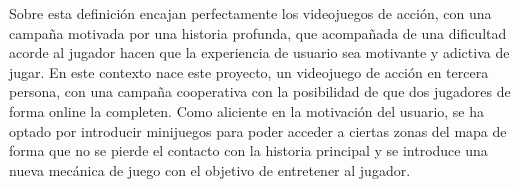 Sobre esta definición encajan perfectamente los videojuegos de acción, con una campaña motivada por una historia profunda, que acompañada de una dificultad acorde al jugador hacen que la experiencia de usuario sea motivante y adictiva de jugar. En este contexto nace este proyecto, un videojuego de acción en tercera persona, con una campaña cooperativa con la posibilidad de que dos jugadores de forma online la completen. Como aliciente en la motivación del usuario, se ha optado por introducir minijuegos para poder acceder a ciertas zonas del mapa de forma que no se pierde el contacto con la historia principal y se introduce una nueva mecánica de juego con el objetivo de entretener al jugador. 
















